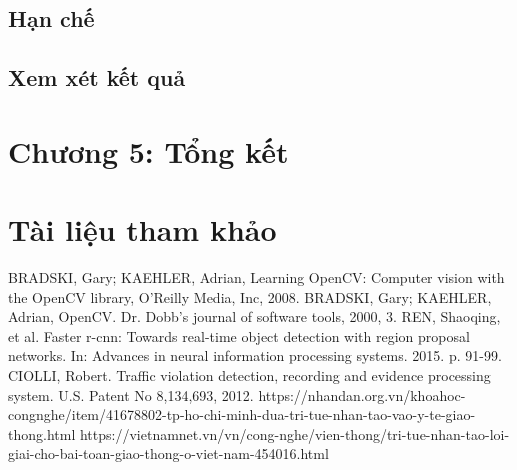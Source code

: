\documentclass[14pt,oneside,a4paper]{extreport}
\begin{document}
\subsection{Hạn chế}
\subsection{Xem xét kết quả}
\section{Chương 5: Tổng kết}
\section{Tài liệu tham khảo}
\renewcommand{\labelenumi}{[\arabic{enumi}]}
\begin{thebibliography}{9}
	 BRADSKI, Gary; KAEHLER, Adrian, Learning OpenCV: Computer vision with the OpenCV library, O'Reilly Media, Inc, 2008.
	 BRADSKI, Gary; KAEHLER, Adrian, OpenCV. Dr. Dobb’s journal of software tools, 2000, 3.
	 REN, Shaoqing, et al. Faster r-cnn: Towards real-time object detection with region proposal networks. In: Advances in neural information processing systems. 2015. p. 91-99.
	 CIOLLI, Robert. Traffic violation detection, recording and evidence processing system. U.S. Patent No 8,134,693, 2012.
	https://nhandan.org.vn/khoahoc-congnghe/item/41678802-tp-ho-chi-minh-dua-tri-tue-nhan-tao-vao-y-te-giao-thong.html
	https://vietnamnet.vn/vn/cong-nghe/vien-thong/tri-tue-nhan-tao-loi-giai-cho-bai-toan-giao-thong-o-viet-nam-454016.html
\end{thebibliography}
\end{document}
